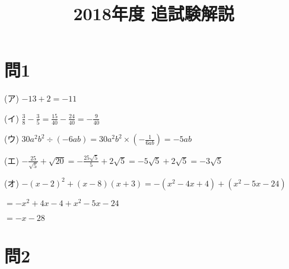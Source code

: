 \documentclass{ltjsarticle}
\begin{document}
\title{2018年度 追試験解説}

\section{問1}

(ア) $-13 + 2 = -11$

(イ) $\frac{3}{8} - \frac{3}{5} = \frac{15}{40} - \frac{24}{40} = -\frac{9}{40}$

(ウ) $30 a^{2} b^{2}\div (-6ab) = 30a^{2}b^{2} \times (-\frac{1}{6ab}) = -5ab$

(エ) $-\frac{25}{\sqrt{5}} + \sqrt{20} = -\frac{25\sqrt{5}}{5} + 2\sqrt{5} = -5\sqrt{5} + 2\sqrt{5} = -3\sqrt{5}$

(オ) $-(x-2)^{2} + (x-8)(x+3) = -(x^{2} - 4x + 4) + (x^{2} - 5x - 24)$

$= -x^{2} + 4x - 4 + x^{2} - 5x - 24$

$= -x - 28$

\section{問2}
\end{document}
